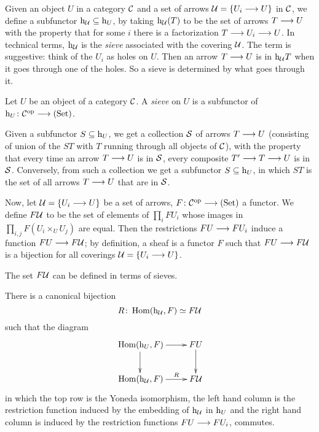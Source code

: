 \begin{2   CONTRAVARIANT FUNCTORS}
\begin{2.3 Sheaves in Grothendieck topologies}
\begin{shaded}
\end{shaded}


Given an object $U$ in a category $\mathcal{C}$ and a set of arrows $\mathcal{U} = \{U_i \longrightarrow U\}$ in $\mathcal{C}$, we define a subfunctor $\mathrm{h}_{\mathcal{U}}  \subseteq \mathrm{h}_U$\index{$\h_{\cU}$}, by taking $\mathrm{h}_{\mathcal{U}}(T)$ to be the set of arrows $T \arr U$ with the property that for some $i$ there is a factorization $T \arr U_i \arr U$. In technical terms, $\h_{\cU}$ is the \emph{sieve}%
 associated with the covering $\mathcal{U}$. The term is suggestive: think of the $U_{i}$ as holes on $U$. Then an arrow $T \arr U$ is in $\mathrm{h}_{\mathcal{U}}T$ when it goes through one of the holes. So a sieve is determined by what goes through it.

\begin{definition}
Let $U$ be an object of a category $\mathcal{C}$. A \emph{sieve}%
 on $U$ is a subfunctor of $\h_{U} \colon \cC\op \arr \catset$.
\end{definition}

Given a subfunctor $S \subseteq \mathrm{h}_{U}$, we get a collection $\mathcal{S}$ of arrows $T \arr U$ (consisting of union of the $ST$  with $T$ running through all objects of $\mathcal{C}$), with the property that every time an arrow $T \arr U$ is in $\mathcal{S}$, every composite $T' \arr T \arr U$ is in $\mathcal{S}$. Conversely, from such a collection we get a subfunctor $S \subseteq \mathrm{h}_{U}$, in which $ST$ is the set of all arrows $T \arr U$ that are in $\mathcal{S}$.

Now, let $\mathcal{U} = \{U_{i} \longrightarrow U\}$ be a set of arrows, $F \colon \cC\op \arr \catset$ a functor. We define $F\mathcal{U}$ to be the set of elements of $\prod_i FU_i$ whose images in $\prod_{i,j} F(U_i \times_U U_j)$ are equal. Then the restrictions $FU \arr FU_i$ induce a function $FU \arr F\cU$; by definition, a sheaf is a functor $F$ such that $FU \arr F\cU$ is a bijection for all coverings $\mathcal{U} = \{U_{i} \longrightarrow U\}$.

The set $F\mathcal{U}$ can be defined in terms of sieves.

\begin{proposition}\label{prop:funnychar-gluing}
There is a canonical bijection 
   \[
   R \colon \operatorname{Hom}(\mathrm{h}_{\mathcal{U}}, F) \simeq F\mathcal{U}
   \]
such that the diagram
   \[
   \xymatrix{
   {}\hom(\h_{U}, F)   \ar[r]\ar[d]  & FU \ar[d] \\
   {}\hom(\h_{\cU}, F) \ar[r]^-{R} & F\cU
   }
   \]
in which the top row is the Yoneda isomorphism, the left hand column is the restriction function induced by the embedding of $\h_{\cU}$ in $\mathrm{h}_{U}$ and the right hand column is induced by the restriction functions $FU \arr FU_{i}$, commutes.
\end{proposition}


\end{2.3 Sheaves in Grothendieck topologies}
\end{2   CONTRAVARIANT FUNCTORS}
